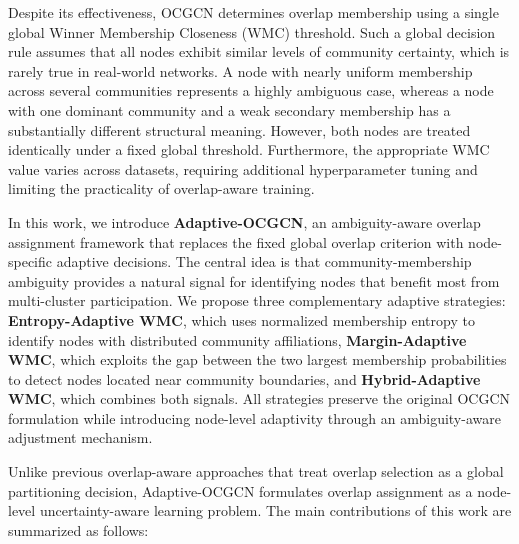 \documentclass[a4paper,11pt,oneside,onecolumn,preprint]{elsarticle}
\numberwithin{equation}{section}
\begin{document}
Despite its effectiveness, OCGCN determines overlap membership using a single global Winner Membership Closeness (WMC) threshold.
Such a global decision rule assumes that all nodes exhibit similar levels of community certainty, which is rarely true in real-world networks.
A node with nearly uniform membership across several communities represents a highly ambiguous case, whereas a node with one dominant community and a weak secondary membership has a substantially different structural meaning.
However, both nodes are treated identically under a fixed global threshold.
Furthermore, the appropriate WMC value varies across datasets, requiring additional hyperparameter tuning and limiting the practicality of overlap-aware training.

In this work, we introduce \textbf{Adaptive-OCGCN}, an ambiguity-aware overlap assignment framework that replaces the fixed global overlap criterion with node-specific adaptive decisions.
The central idea is that community-membership ambiguity provides a natural signal for identifying nodes that benefit most from multi-cluster participation.
We propose three complementary adaptive strategies: \textbf{Entropy-Adaptive WMC}, which uses normalized membership entropy to identify nodes with distributed community affiliations, \textbf{Margin-Adaptive WMC}, which exploits the gap between the two largest membership probabilities to detect nodes located near community boundaries, and \textbf{Hybrid-Adaptive WMC}, which combines both signals.
All strategies preserve the original OCGCN formulation while introducing node-level adaptivity through an ambiguity-aware adjustment mechanism.

Unlike previous overlap-aware approaches that treat overlap selection as a global partitioning decision, Adaptive-OCGCN formulates overlap assignment as a node-level uncertainty-aware learning problem.
The main contributions of this work are summarized as follows:
\end{document}
